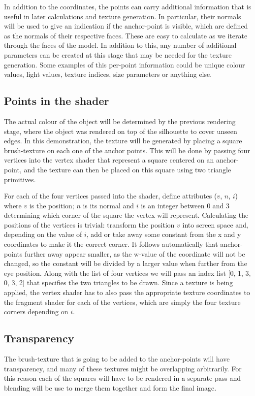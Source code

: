 \documentclass[a4paper, 12pt]{article}
\begin{document}
In addition to the coordinates, the points can carry additional information that is useful in later calculations and texture generation. In particular, their normals will be used to give an indication if the anchor-point is visible, which are defined as the normals of their respective faces. These are easy to calculate as we iterate through the faces of the model. In addition to this, any number of additional parameters can be created at this stage that may be needed for the texture generation. Some examples of this per-point information could be unique colour values, light values, texture indices, size parameters or anything else.


\subsection{Points in the shader}
The actual colour of the object will be determined by the previous rendering stage, where the object was rendered on top of the silhouette to cover unseen edges. In this demonstration, the texture will be generated by placing a square brush-texture on each one of the anchor points. This will be done by passing four vertices into the vertex shader that represent a square centered on an anchor-point, and the texture can then be placed on this square using two triangle primitives.

For each of the four vertices passed into the shader, define attributes ($v$, $n$, $i$) where $v$ is the position; $n$ is its normal and $i$ is an integer between 0 and 3 determining which corner of the square the vertex will represent. Calculating the positions of the vertices is trivial: transform the position $v$ into screen space and, depending on the value of $i$, add or take away some constant from the x and y coordinates to make it the correct corner. It follows automatically that anchor-points further away appear smaller, as the w-value of the coordinate will not be changed, so the constant will be divided by a larger value when further from the eye position. Along with the list of four vertices we will pass an index list [0, 1, 3, 0, 3, 2] that specifies the two triangles to be drawn. Since a texture is being applied, the vertex shader has to also pass the appropriate texture coordinates to the fragment shader for each of the vertices, which are simply the four texture corners depending on $i$.


\subsection{Transparency}
The brush-texture that is going to be added to the anchor-points will have transparency, and many of these textures might be overlapping arbitrarily. For this reason each of the squares will have to be rendered in a separate pass and blending will be use to merge them together and form the final image.
\end{document}
